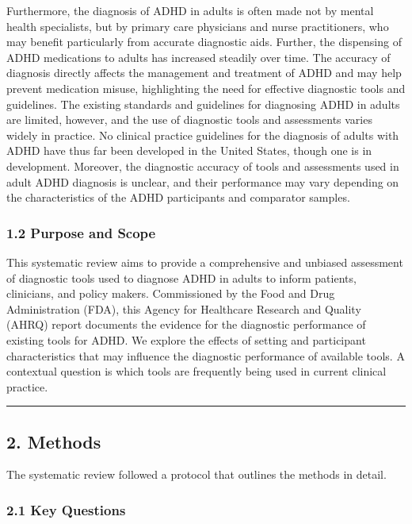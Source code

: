 \documentclass[
  12pt,
  letterpaper,
]{article}
\renewcommand{\[}{\begin{singlespace}\oldDisplayMath}
\renewcommand{\]}{\endoldDisplayMath\end{singlespace}\vspace{\baselineskip}}
\begin{document}
Furthermore, the diagnosis of ADHD in adults is often made not by mental
health specialists, but by primary care physicians and nurse
practitioners, who may benefit particularly from accurate diagnostic
aids. Further, the dispensing of ADHD medications to adults has
increased steadily over time. The accuracy of diagnosis directly affects
the management and treatment of ADHD and may help prevent medication
misuse, highlighting the need for effective diagnostic tools and
guidelines. The existing standards and guidelines for diagnosing ADHD in
adults are limited, however, and the use of diagnostic tools and
assessments varies widely in practice. No clinical practice guidelines
for the diagnosis of adults with ADHD have thus far been developed in
the United States, though one is in development. Moreover, the
diagnostic accuracy of tools and assessments used in adult ADHD
diagnosis is unclear, and their performance may vary depending on the
characteristics of the ADHD participants and comparator samples.

\subsubsection{1.2 Purpose and Scope}\label{purpose-and-scope}

This systematic review aims to provide a comprehensive and unbiased
assessment of diagnostic tools used to diagnose ADHD in adults to inform
patients, clinicians, and policy makers. Commissioned by the Food and
Drug Administration (FDA), this Agency for Healthcare Research and
Quality (AHRQ) report documents the evidence for the diagnostic
performance of existing tools for ADHD. We explore the effects of
setting and participant characteristics that may influence the
diagnostic performance of available tools. A contextual question is
which tools are frequently being used in current clinical practice.

\begin{center}\rule{0.5\linewidth}{0.5pt}\end{center}

\subsection{2. Methods}\label{methods}

The systematic review followed a protocol that outlines the methods in
detail.

\subsubsection{2.1 Key Questions}\label{key-questions}
\end{document}

